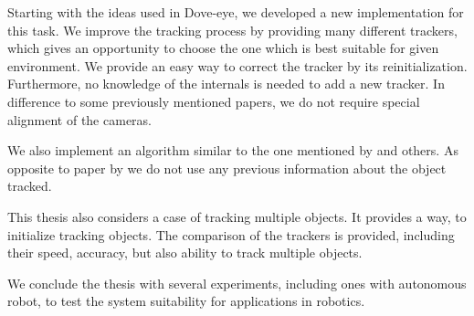 Starting with the ideas used in Dove-eye, we developed a new implementation for
this task. We improve the tracking process by providing many different
trackers, which gives an opportunity to choose the one which is best suitable for
given environment. We provide an easy way to correct the tracker by its
reinitialization. Furthermore, no knowledge of the internals is needed to add a
new tracker.  In difference to some previously mentioned papers, we do not
require special alignment of the cameras. 

We also implement an algorithm similar to the one mentioned by
\citet*{ibisch2015arbitrary} and others. As opposite to paper by
\citet*{kappeler20103d} we do not use any previous information about the object
tracked.

This thesis also considers a case of tracking multiple objects. It provides a
way, to initialize tracking objects. The comparison of the trackers is
provided, including their speed, accuracy, but also ability to track
multiple objects.

We conclude the thesis with several experiments, including ones with autonomous
robot, to test the system suitability for applications in robotics.

